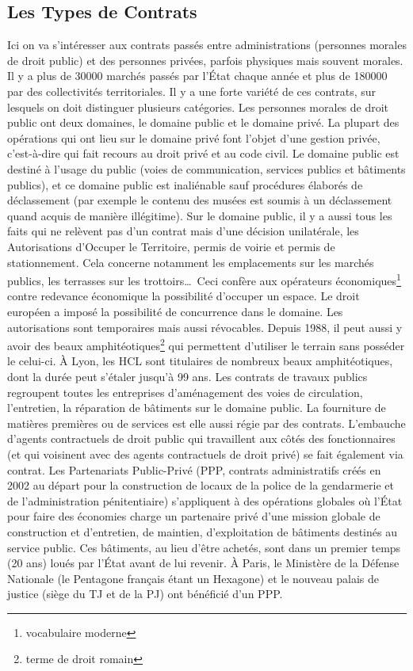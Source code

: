 \documentclass[math]{cours}
\begin{document}
\subsection{Les Types de Contrats}
Ici on va s'intéresser aux contrats passés entre administrations (personnes morales de droit public) et des personnes privées, parfois physiques mais souvent morales.
Il y a plus de 30000 marchés passés par l'État chaque année et plus de 180000 par des collectivités territoriales.
Il y a une forte variété de ces contrats, sur lesquels on doit distinguer plusieurs catégories.
Les personnes morales de droit public ont deux domaines, le domaine public et le domaine privé.
La plupart des opérations qui ont lieu sur le domaine privé font l'objet d'une gestion privée, c'est-à-dire qui fait recours au droit privé et au code civil.
Le domaine public est destiné à l'usage du public (voies de communication, services publics et bâtiments publics), et ce domaine public est inaliénable sauf procédures élaborés de déclassement (par exemple le contenu des musées est soumis à un déclassement quand acquis de manière illégitime).
Sur le domaine public, il y a aussi tous les faits qui ne relèvent pas d'un contrat mais d'une décision unilatérale, les Autorisations d'Occuper le Territoire, permis de voirie et permis de stationnement.
Cela concerne notamment les emplacements sur les marchés publics, les terrasses sur les trottoirs\ldots\
Ceci confère aux opérateurs économiques\footnote{vocabulaire moderne} contre redevance économique la possibilité d'occuper un espace.
Le droit européen a imposé la possibilité de concurrence dans le domaine.
Les autorisations sont temporaires mais aussi révocables.
Depuis 1988, il peut aussi y avoir des beaux amphitéotiques\footnote{terme de droit romain} qui permettent d'utiliser le terrain sans posséder le celui-ci. À Lyon, les HCL sont titulaires de nombreux beaux amphitéotiques, dont la durée peut s'étaler jusqu'à 99 ans.
Les contrats de travaux publics regroupent toutes les entreprises d'aménagement des voies de circulation, l'entretien, la réparation de bâtiments sur le domaine public.
La fourniture de matières premières ou de services est elle aussi régie par des contrats.
L'embauche d'agents contractuels de droit public qui travaillent aux côtés des fonctionnaires (et qui voisinent avec des agents contractuels de droit privé) se fait également via contrat.
Les Partenariats Public-Privé (PPP, contrats administratifs créés en 2002 au départ pour la construction de locaux de la police de la gendarmerie et de l'administration pénitentiaire)
s'appliquent à des opérations globales où l'État pour faire des économies charge un partenaire privé d'une mission globale de construction et d'entretien, de maintien, d'exploitation de bâtiments destinés au service public.
Ces bâtiments, au lieu d'être achetés, sont dans un premier temps (20 ans) loués par l'État avant de lui revenir.
À Paris, le Ministère de la Défense Nationale (le Pentagone français étant un Hexagone) et le nouveau palais de justice (siège du TJ et de la PJ) ont bénéficié d'un PPP.
\end{document}
